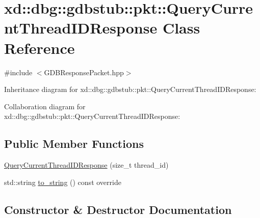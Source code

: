 \hypertarget{classxd_1_1dbg_1_1gdbstub_1_1pkt_1_1_query_current_thread_i_d_response}{}\section{xd\+:\+:dbg\+:\+:gdbstub\+:\+:pkt\+:\+:Query\+Current\+Thread\+I\+D\+Response Class Reference}
\label{classxd_1_1dbg_1_1gdbstub_1_1pkt_1_1_query_current_thread_i_d_response}


{\ttfamily \#include $<$G\+D\+B\+Response\+Packet.\+hpp$>$}



Inheritance diagram for xd\+:\+:dbg\+:\+:gdbstub\+:\+:pkt\+:\+:Query\+Current\+Thread\+I\+D\+Response\+:


Collaboration diagram for xd\+:\+:dbg\+:\+:gdbstub\+:\+:pkt\+:\+:Query\+Current\+Thread\+I\+D\+Response\+:
\subsection*{Public Member Functions}
\begin{DoxyCompactItemize}
\item 
\mbox{\hyperlink{classxd_1_1dbg_1_1gdbstub_1_1pkt_1_1_query_current_thread_i_d_response_a446c7344b4c2269969d01f49e53fbe3a}{Query\+Current\+Thread\+I\+D\+Response}} (size\+\_\+t thread\+\_\+id)
\item 
std\+::string \mbox{\hyperlink{classxd_1_1dbg_1_1gdbstub_1_1pkt_1_1_query_current_thread_i_d_response_a59e75efa133c4c1c8f5e606ea638f012}{to\+\_\+string}} () const override
\end{DoxyCompactItemize}


\subsection{Constructor \& Destructor Documentation}
\mbox{\label{classxd_1_1dbg_1_1gdbstub_1_1pkt_1_1_query_current_thread_i_d_response_a446c7344b4c2269969d01f49e53fbe3a}} 
